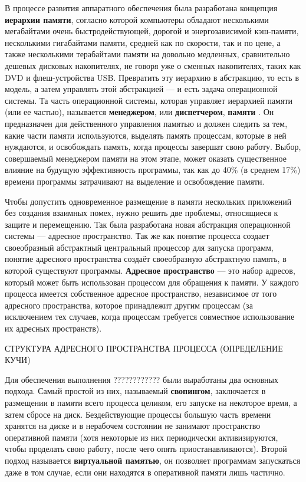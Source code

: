 В процессе развития аппаратного обеспечения была разработана концепция \textbf{иерархии памяти}, согласно которой компьютеры обладают несколькими мегабайтами очень быстродействующей, дорогой и энергозависимой кэш-памяти, несколькими гигабайтами памяти, средней как по скорости, так и по цене, а также несколькими терабайтами памяти на довольно медленных, сравнительно дешевых дисковых накопителях, не говоря уже о сменных накопителях, таких как DVD и флеш-устройства USB. Превратить эту иерархию в абстракцию, то есть в модель, а затем управлять этой абстракцией --- и есть задача операционной системы. Та часть операционной системы, которая управляет иерархией памяти (или ее частью), называется \textbf{менеджером}, или \textbf{диспетчером}, \textbf{памяти} \cite{tannenbaum}. Он предназначен для действенного управления памятью и должен следить за тем, какие части памяти используются, выделять память процессам, которые в ней нуждаются, и освобождать память, когда процессы завершат свою работу. Выбор, совершаемый менеджером памяти на этом этапе, может оказать существенное влияние на будущую эффективность программы, так как до 40\% (в среднем 17\%) времени программы затрачивают на выделение и освобождение памяти. \cite{cornell}

Чтобы допустить одновременное размещение в памяти нескольких приложений без создания взаимных помех, нужно решить две проблемы, относящиеся к защите и перемещению. Так была разработана новая абстракция операционной системы --- адресное пространство. Так же как понятие процесса создает своеобразный абстрактный центральный процессор для запуска программ, понятие адресного пространства создаёт своеобразную абстрактную память, в которой существуют программы. \textbf{Адресное пространство} \cite{tannenbaum} --- это набор адресов, который может быть использован процессом для обращения к памяти. У каждого процесса имеется собственное адресное пространство, независимое от того адресного пространства, которое принадлежит другим процессам (за исключением тех случаев, когда процессам требуется совместное использование их адресных пространств).

СТРУКТУРА АДРЕСНОГО ПРОСТРАНСТВА ПРОЦЕССА (ОПРЕДЕЛЕНИЕ КУЧИ)

Для обеспечения выполнения ???????????? были выработаны два основных подхода. Самый простой из них, называемый \textbf{свопингом}, заключается в размещении в памяти всего процесса целиком, его запуске на некоторое время, а затем сбросе на диск. Бездействующие процессы большую часть времени хранятся на диске и в нерабочем состоянии не занимают пространство оперативной памяти (хотя некоторые из них периодически активизируются, чтобы проделать свою работу, после чего опять приостанавливаются). Второй подход называется \textbf{виртуальной памятью}, он позволяет программам запускаться даже в том случае, если они находятся в оперативной памяти лишь частично.

